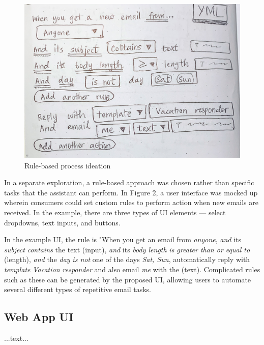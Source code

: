 \documentclass{article}
\begin{document}
\begin{figure}\centering
	\includegraphics[scale=0.092]{drawing-rules-ui.jpg}
	\caption{Rule-based process ideation}
\end{figure}

In a separate exploration, a rule-based approach was chosen rather than specific tasks that the assistant can perform. In Figure 2, a user interface was mocked up wherein consumers could set custom rules to perform action when new emails are received. In the example, there are three types of UI elements --- select dropdowns, text inputs, and buttons.

In the example UI, the rule is "When you get an email from \emph{anyone}, \emph{and} its \emph{subject} \emph{contains} the text (input), \emph{and} its \emph{body length} \emph{is greater than or equal to} (length), \emph{and} the \emph{day} \emph{is not} one of the days \emph{Sat, Sun}, automatically reply with \emph{template} \emph{Vacation responder} and also email \emph{me} with the (text). Complicated rules such as these can be generated by the proposed UI, allowing users to automate several different types of repetitive email tasks.

\subsection{Web App UI}

...text...
\end{document}
